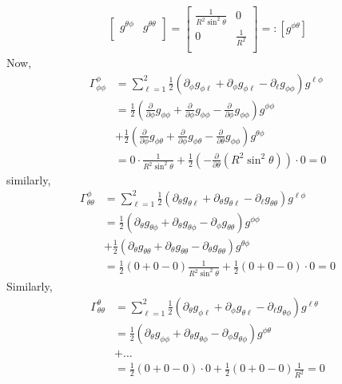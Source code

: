 \documentclass{article}
\begin{document}
\begin{homeworkProblem}
\begin{align}
\begin{bmatrix}
            g^{\theta \phi} & g^{\theta \theta}\\
        \end{bmatrix}
        =
        \begin{bmatrix}
            \frac{ 1 }{ R^2 \sin^{2} \theta } & 0 \\
            0 & \frac{ 1 }{ R^{2} }\\
        \end{bmatrix} =: \left[ g^{\phi \theta}\right]
    \end{align}
    Now, 
    \begin{align}
        \Gamma_{\phi \phi}^{\phi} &= \sum_{\ell = 1}^2 \frac{ 1 }{ 2 } \left( \partial_{\phi} g_{\phi \ell} + \partial_{\phi} g_{\phi \ell} 
        - \partial_{\ell} g_{\phi \phi}\right)
        g^{\ell \phi}\\
        &= \frac{ 1 }{ 2 } \left( \frac{ \partial }{ \partial \phi } g_{\phi \phi} + 
        \frac{ \partial }{ \partial \phi } g_{\phi \phi}
        - \frac{ \partial }{ \partial \phi } g_{\phi \phi}\right)
        g^{\phi \phi}\\
        &+ \frac{ 1 }{ 2 }
        \left(\frac{ \partial }{ \partial \phi } g_{\phi \theta}
        + \frac{ \partial }{ \partial \phi }g_{\phi \theta}
    -\frac{ \partial }{ \partial \theta } g_{\phi \phi}\right)
    g^{\theta \phi}\\
    &= 0 \cdot \frac{ 1 }{ R^2 \sin^{2} \theta } + \frac{ 1 }{ 2 }\left( - \frac{ \partial }{ \partial \theta }(R^2 \sin^2 \theta) \right) \cdot 0 = 0
    \end{align}
    similarly,
    \begin{align}
        \Gamma^{\phi}_{\theta \theta} &= \sum_{\ell = 1}^2 \frac{ 1 }{ 2 }
        \left( \partial_{\theta} g_{\theta \ell}
        + \partial_{\theta} g_{\theta \ell}
    -\partial_{\ell} g_{\theta \theta}\right)
    g^{\ell \phi}\\
    &= \frac{ 1 }{ 2 }
    \left( \partial_{\theta} g_{\theta \phi}
    + \partial_{\theta} g_{\theta \phi}
- \partial_{\phi} g_{\theta \theta}\right)
g^{\phi \phi}\\
&+ \frac{ 1 }{ 2 }
\left( \partial_{\theta} g_{\theta \theta}
+ \partial_{\theta} g_{\theta \theta}
- \partial_{\theta} g_{\theta \theta}\right)
g^{\theta \phi}\\
&= \frac{ 1 }{ 2 } (0+0-0)\frac{ 1 }{ R^2 \sin^2 \theta } + \frac{ 1 }{ 2 }(0+0-0)\cdot 0
=0
    \end{align}
    Similarly,
    \begin{align}
        \Gamma^{\theta}_{\theta \theta} 
        &= \sum_{\ell = 1}^2 \frac{ 1 }{ 2 }
        \left( \partial_{\theta} g_{\phi \ell}
    +\partial_{\phi} g_{\theta \ell}
-\partial_{\ell} g_{\theta \phi} \right) 
g^{\ell \theta}\\
&= \frac{ 1 }{ 2 }
\left(
\partial_{\theta} g_{\phi \phi} 
+\partial_{\theta} g_{\theta \phi} 
-\partial_{\phi} g_{\theta \phi} 
\right)
g^{\phi \theta}\\
&+ \ldots\\
&= \frac{ 1 }{ 2 }(0+0-0) \cdot 0 
+ \frac{ 1 }{ 2 } (0 + 0 - 0) \frac{ 1 }{ R^2 } =0
    \end{align}
    

\end{homeworkProblem}
\end{document}
